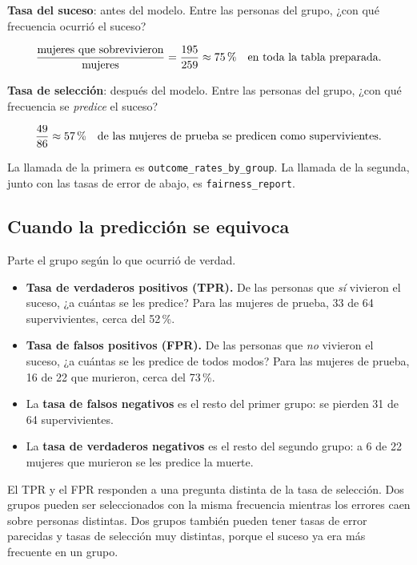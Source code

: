 \documentclass[11pt]{article}
\newcommand{\fn}[1]{\texttt{\small #1}}
\newcommand{\pct}[1]{\mbox{#1\,\%}}
\begin{document}
\begin{idea}
\textbf{Tasa del suceso}: antes del modelo. Entre las personas del grupo, ¿con qué frecuencia ocurrió el suceso?

\[
\frac{\text{mujeres que sobrevivieron}}{\text{mujeres}} = \frac{195}{259} \approx \pct{75}
\quad\text{en toda la tabla preparada.}
\]

\textbf{Tasa de selección}: después del modelo. Entre las personas del grupo, ¿con qué frecuencia se \emph{predice} el suceso?

\[
\frac{49}{86} \approx \pct{57}
\quad\text{de las mujeres de prueba se predicen como supervivientes.}
\]

La llamada de la primera es \fn{outcome\_rates\_by\_group}. La llamada de la segunda, junto con las tasas de error de abajo, es \fn{fairness\_report}.
\end{idea}

\subsection{Cuando la predicción se equivoca}

Parte el grupo según lo que ocurrió de verdad.

\begin{itemize}
  \item \textbf{Tasa de verdaderos positivos (TPR).} De las personas que \emph{sí} vivieron el suceso, ¿a cuántas se les predice? Para las mujeres de prueba, 33 de 64 supervivientes, cerca del \pct{52}.
  \item \textbf{Tasa de falsos positivos (FPR).} De las personas que \emph{no} vivieron el suceso, ¿a cuántas se les predice de todos modos? Para las mujeres de prueba, 16 de 22 que murieron, cerca del \pct{73}.
  \item La \textbf{tasa de falsos negativos} es el resto del primer grupo: se pierden 31 de 64 supervivientes.
  \item La \textbf{tasa de verdaderos negativos} es el resto del segundo grupo: a 6 de 22 mujeres que murieron se les predice la muerte.
\end{itemize}

El TPR y el FPR responden a una pregunta distinta de la tasa de selección. Dos grupos pueden ser seleccionados con la misma frecuencia mientras los errores caen sobre personas distintas. Dos grupos también pueden tener tasas de error parecidas y tasas de selección muy distintas, porque el suceso ya era más frecuente en un grupo.
\end{document}

